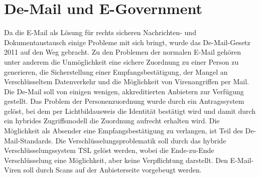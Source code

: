 \documentclass[
	12pt,
	a4paper,
	BCOR10mm,
	DIV14,
	listof=totoc,
	bibliography=totoc,
	headsepline
]{scrreprt}
\begin{document}



\section{De-Mail und E-Government}
\label{demail}
Da die E-Mail als Lösung für rechts sicheren Nachrichten- und Dokumentaustausch einige Probleme mit sich bringt, wurde das De-Mail-Gesetz 2011 auf den Weg gebracht.
Zu den Problemen der normalen E-Mail gehören unter anderem die Unmöglichkeit eine sichere Zuordnung zu einer Person zu generieren, die Sicherstellung einer Empfangsbestätigung, der Mangel an Verschlüsseltem Datenverkehr und die Möglichkeit von Virenangriffen per Mail.
Die De-Mail soll von einigen wenigen, akkreditierten Anbietern zur Verfügung gestellt.
Das Problem der Personenzuordnung wurde durch ein Antragssystem gelöst, bei dem per Lichtbildausweis die Identität bestätigt wird und damit durch ein hybrides Zugriffsmodell die Zuordnung aufrecht erhalten wird.
Die Möglichkeit als Absender eine Empfangsbestätigung zu verlangen, ist Teil des De-Mail-Standards.
Die Verschlüsselungsproblematik soll durch das hybride Verschlüsselungssystem TSL gelöst werden, wobei die Ende-zu-Ende Verschlüsselung eine Möglichkeit, aber keine Verpflichtung darstellt.
Den E-Mail-Viren soll durch Scans auf der Anbieterseite vorgebeugt werden.
\end{document}
